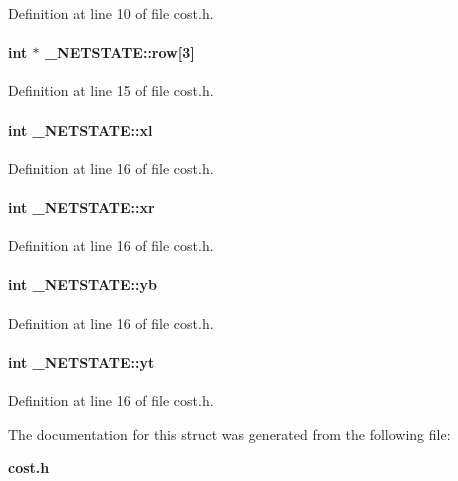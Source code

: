 Definition at line 10 of file cost.h.\label{_NETSTATE_m6}
\paragraph{\setlength{\rightskip}{0pt plus 5cm}int $\ast$ \_\-NETSTATE::row[3]}\hfill



Definition at line 15 of file cost.h.\label{_NETSTATE_m7}
\paragraph{\setlength{\rightskip}{0pt plus 5cm}int \_\-NETSTATE::xl}\hfill



Definition at line 16 of file cost.h.\label{_NETSTATE_m8}
\paragraph{\setlength{\rightskip}{0pt plus 5cm}int \_\-NETSTATE::xr}\hfill



Definition at line 16 of file cost.h.\label{_NETSTATE_m9}
\paragraph{\setlength{\rightskip}{0pt plus 5cm}int \_\-NETSTATE::yb}\hfill



Definition at line 16 of file cost.h.\label{_NETSTATE_m10}
\paragraph{\setlength{\rightskip}{0pt plus 5cm}int \_\-NETSTATE::yt}\hfill



Definition at line 16 of file cost.h.

The documentation for this struct was generated from the following file:\begin{CompactItemize}
\item 
{\bf cost.h}\end{CompactItemize}
